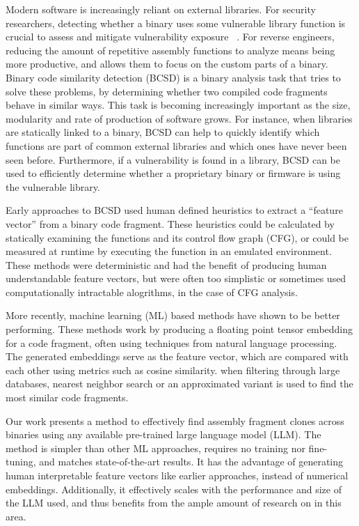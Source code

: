 \documentclass[conference,compsoc]{IEEEtran}
\begin{document}
Modern software is increasingly reliant on external libraries.
For security researchers, detecting whether a binary uses some vulnerable library function is crucial to assess
and mitigate vulnerability exposure ~\cite{BCSD, BCSDsurvey}. For reverse engineers, reducing the amount of repetitive assembly functions
to analyze means being more productive, and allows them to focus on the custom parts of a binary.  Binary code similarity
detection (BCSD) is a binary analysis task that tries to solve these problems, by determining whether two compiled
code fragments behave in similar ways. This task is becoming increasingly important as the size, modularity and rate of
production of software grows.  For instance, when libraries are statically linked to a binary, BCSD can help to
quickly identify which functions are part of common external libraries and which ones have never been seen before.
Furthermore, if a vulnerability is found in a library, BCSD can be used to efficiently determine whether a proprietary
binary or firmware is using the vulnerable library.

Early approaches to BCSD used human defined heuristics to extract a ``feature vector'' from a binary code fragment. These heuristics
could be calculated by statically examining the functions and its control flow graph (CFG), or could be measured at runtime
by executing the function in an emulated environment. These methods were deterministic and had the benefit of producing
human understandable feature vectors, but were often too simplistic or sometimes used computationally intractable alogrithms, in
the case of CFG analysis.

More recently, machine learning (ML) based methods have shown to be better performing.
These methods work by producing a floating point tensor embedding for a code fragment, often using techniques from
natural language processing. The generated embeddings serve as the feature vector, which are compared
with each other using metrics such as cosine similarity. when filtering through large databases, nearest neighbor search
or an approximated variant is used to find the most similar code fragments.

Our work presents a method to effectively find assembly fragment clones across binaries using any available pre-trained
large language model (LLM). The method is simpler than other ML approaches, requires no training nor fine-tuning, and
matches state-of-the-art results. It has the advantage of generating human interpretable feature vectors like earlier approaches,
instead of numerical embeddings. Additionally, it effectively scales with the performance and size of the LLM used, and thus
benefits from the ample amount of research on in this area.
\end{document}

